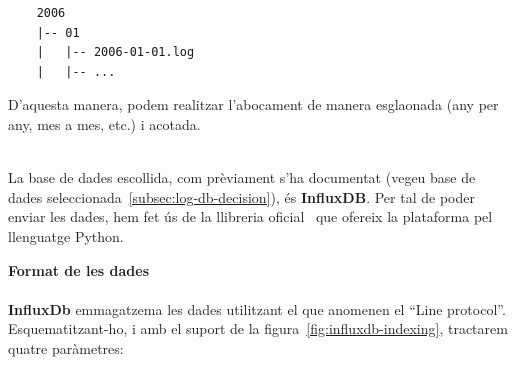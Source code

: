 \begin{verbatim}
    2006
    |-- 01
    |   |-- 2006-01-01.log
    |   |-- ...
\end{verbatim}
\noindent
D’aquesta manera, podem realitzar l’abocament de manera esglaonada (any per any, mes a mes, etc.) i acotada.

\noindent \\
La base de dades escollida, com prèviament s’ha documentat (vegeu base de dades seleccionada~\ref{subsec:log-db-decision}), és \textbf{InfluxDB}.
Per tal de poder enviar les dades, hem fet ús de la llibreria oficial~\cite{influxdb:python} que ofereix la plataforma pel llenguatge Python.

\clearpage

\noindent
\textbf{Format de les dades} \\ \\
\textbf{InfluxDb} emmagatzema les dades utilitzant el que anomenen el ``Line protocol''.
Esquematitzant-ho, i amb el suport de la figura~\ref{fig:influxdb-indexing}, tractarem quatre paràmetres:

